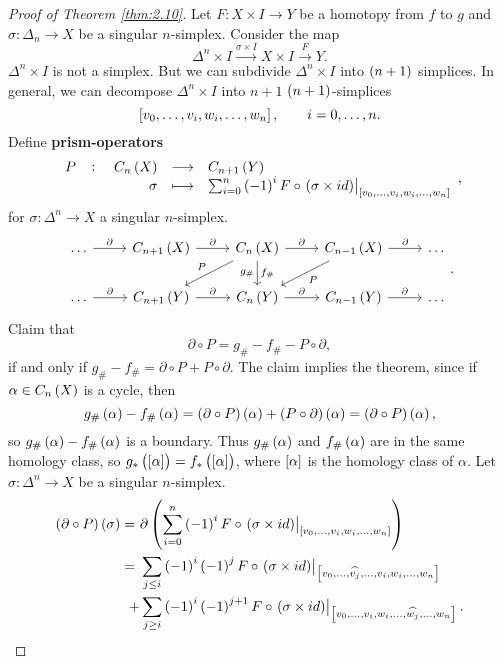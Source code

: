 \begin{proof}[Proof of Theorem \ref{thm:2.10}]
Let $ F : X \times I \to Y $ be a homotopy from $ f $ to $ g $ and $ \sigma : \Delta_n \to X $ be a singular $ n $-simplex. Consider the map
$$ \Delta^n \times I \xrightarrow{\sigma \times I} X \times I \xrightarrow{F} Y. $$
$ \Delta^n \times I $ is not a simplex. But we can subdivide $ \Delta^n \times I $ into $ \br{n + 1} $ simplices. In general, we can decompose $ \Delta^n \times I $ into $ n + 1 $ $ \br{n + 1} $-simplices
$$ \sbr{v_0, \dots, v_i, w_i, \dots, w_n}, \qquad i = 0, \dots, n. $$
Define \textbf{prism-operators}
$$ \function[P]{C_n\br{X}}{C_{n + 1}\br{Y}}{\sigma}{\sum_{i = 0}^n \br{-1}^iF \circ \eval{\br{\sigma \times id}}_{\sbr{v_0, \dots, v_i, w_i, \dots, w_n}}}, $$
for $ \sigma : \Delta^n \to X $ a singular $ n $-simplex.
$$
\begin{tikzcd}
\dots \arrow{r}{\partial} & C_{n + 1}\br{X} \arrow{r}{\partial} & C_n\br{X} \arrow{r}{\partial} \arrow[swap]{dl}{P} \arrow{d}{f_\#}[swap]{g_\#} & C_{n - 1}\br{X} \arrow{r}{\partial} \arrow{dl}{P} & \dots \\
\dots \arrow{r}{\partial} & C_{n + 1}\br{Y} \arrow{r}{\partial} & C_n\br{Y} \arrow{r}{\partial} & C_{n - 1}\br{Y} \arrow{r}{\partial} & \dots
\end{tikzcd}.
$$
Claim that
$$ \partial \circ P = g_\# - f_\# - P \circ \partial, $$
if and only if $ g_\# - f_\# = \partial \circ P + P \circ \partial $. The claim implies the theorem, since if $ \alpha \in C_n\br{X} $ is a cycle, then
$$ g_\#\br{\alpha} - f_\#\br{\alpha} = \br{\partial \circ P}\br{\alpha} + \br{P \circ \partial}\br{\alpha} = \br{\partial \circ P}\br{\alpha}, $$
so $ g_\#\br{\alpha} - f_\#\br{\alpha} $ is a boundary. Thus $ g_\#\br{\alpha} $ and $ f_\#\br{\alpha} $ are in the same homology class, so $ g_*\br{\sbr{\alpha}} = f_*\br{\sbr{\alpha}} $, where $ \sbr{\alpha} $ is the homology class of $ \alpha $. Let $ \sigma : \Delta^n \to X $ be a singular $ n $-simplex.
\begin{align*}
\br{\partial \circ P}\br{\sigma}
= \ & \partial\br{\sum_{i = 0}^n \br{-1}^iF \circ \eval{\br{\sigma \times id}}_{\sbr{v_0, \dots, v_i, w_i, \dots, w_n}}} \\
= \ & \sum_{j \le i} \br{-1}^i\br{-1}^jF \circ \eval{\br{\sigma \times id}}_{\sbr{v_0, \dots, \widehat{v_j}, \dots, v_i, w_i, \dots, w_n}} \\
+ & \sum_{j \ge i} \br{-1}^i\br{-1}^{j + 1}F \circ \eval{\br{\sigma \times id}}_{\sbr{v_0, \dots, v_i, w_i, \dots, \widehat{w_j}, \dots, w_n}}.
\end{align*}

\end{proof}
